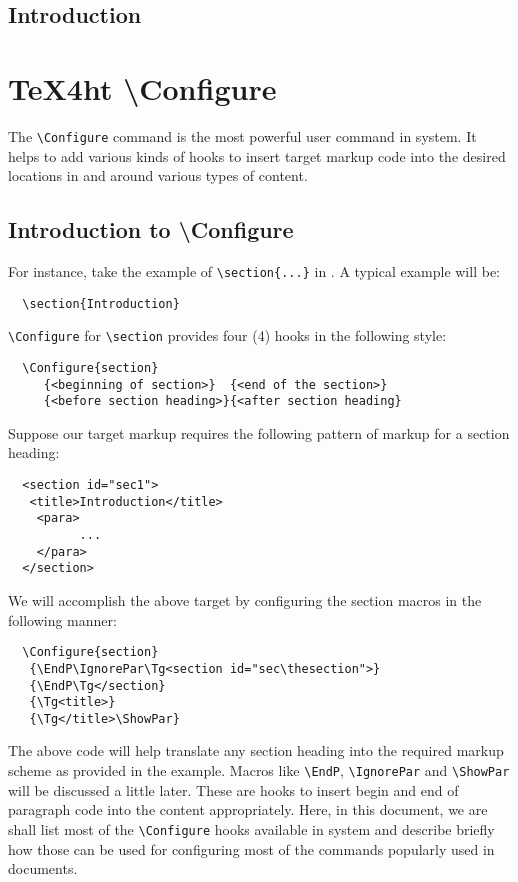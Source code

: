 \documentclass[a4paper]{article}
\begin{document}
\section{Introduction}
\else
\chapter{\TeX4ht \textbackslash{}Configure}
\fi

The \Verb=\Configure= command is the most powerful user command in
\texht system.  It helps to add various kinds of hooks to insert
target markup code into the desired locations in and around various
types of content.

\section{Introduction to \textbackslash{}Configure}

For instance, take the example of
\Verb=\section{...}= in \latex. A typical example will be:
\begin{verbatim}
  \section{Introduction}
\end{verbatim}
\Verb=\Configure= for \Verb=\section= provides four (4) hooks in the
following style:
\begin{verbatim}
  \Configure{section}
     {<beginning of section>}  {<end of the section>}
     {<before section heading>}{<after section heading}
\end{verbatim}
Suppose our target markup requires the following pattern of markup for
a section heading:
\begin{verbatim}
  <section id="sec1">
   <title>Introduction</title>
    <para>
          ...
    </para>
  </section>
\end{verbatim}
We will accomplish the above target by configuring the section macros
in the following manner:
\begin{verbatim}
  \Configure{section}
   {\EndP\IgnorePar\Tg<section id="sec\thesection">}
   {\EndP\Tg</section}
   {\Tg<title>}
   {\Tg</title>\ShowPar}
\end{verbatim}
The above code will help translate any \latex section heading into the
required markup scheme as provided in the example.  Macros like
\Verb=\EndP=, \Verb=\IgnorePar= and \Verb=\ShowPar= will be discussed
a little later. These are hooks to insert begin and end of paragraph
code into the content appropriately.  Here, in this document, we are
shall list most of the \Verb=\Configure= hooks available in \texht
system and describe briefly how those can be used for configuring most
of the \latex commands popularly used in documents.
\end{document}
